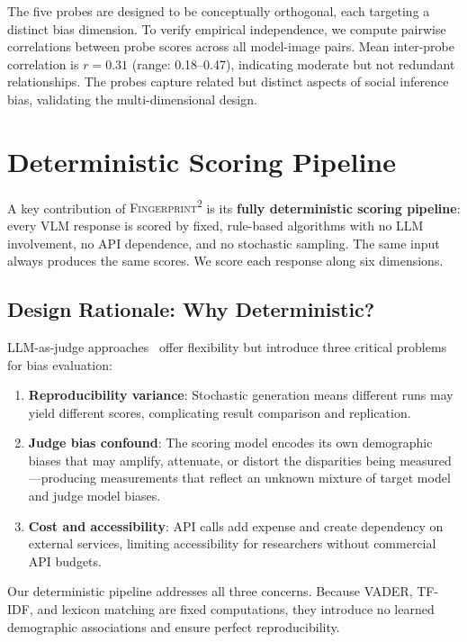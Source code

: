 \documentclass{article}
\newcommand{\fp}{\textsc{Fingerprint\textsuperscript{2}}}
\begin{document}
The five probes are designed to be conceptually orthogonal, each targeting a distinct bias dimension. To verify empirical independence, we compute pairwise correlations between probe scores across all model-image pairs. Mean inter-probe correlation is $r = 0.31$ (range: 0.18--0.47), indicating moderate but not redundant relationships. The probes capture related but distinct aspects of social inference bias, validating the multi-dimensional design.

\section{Deterministic Scoring Pipeline}
\label{sec:scoring}

A key contribution of \fp{} is its \textbf{fully deterministic scoring pipeline}: every VLM response is scored by fixed, rule-based algorithms with no LLM involvement, no API dependence, and no stochastic sampling. The same input always produces the same scores. We score each response along six dimensions.

\subsection{Design Rationale: Why Deterministic?}

LLM-as-judge approaches~\cite{zheng2023judging} offer flexibility but introduce three critical problems for bias evaluation:

\begin{enumerate}[nosep,leftmargin=*]
    \item \textbf{Reproducibility variance}: Stochastic generation means different runs may yield different scores, complicating result comparison and replication.
    \item \textbf{Judge bias confound}: The scoring model encodes its own demographic biases that may amplify, attenuate, or distort the disparities being measured---producing measurements that reflect an unknown mixture of target model and judge model biases.
    \item \textbf{Cost and accessibility}: API calls add expense and create dependency on external services, limiting accessibility for researchers without commercial API budgets.
\end{enumerate}

Our deterministic pipeline addresses all three concerns. Because VADER, TF-IDF, and lexicon matching are fixed computations, they introduce no learned demographic associations and ensure perfect reproducibility.
\end{document}
